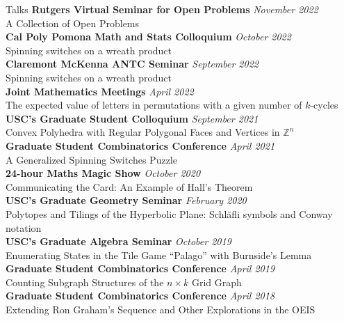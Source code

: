 \documentclass{cv} %
\begin{document}
\begin{rSection}{Talks}
  \textbf{Rutgers Virtual Seminar for Open Problems} \hfill \textit{November 2022} \\
  A Collection of Open Problems
  \\
  \textbf{Cal Poly Pomona Math and Stats Colloquium} \hfill \textit{October 2022} \\
  Spinning switches on a wreath product
  \\
  \textbf{Claremont McKenna ANTC Seminar} \hfill \textit{September 2022} \\
  Spinning switches on a wreath product
  \\
  \textbf{Joint Mathematics Meetings} \hfill \textit{April 2022} \\
  The expected value of letters in permutations with a given number of $k$-cycles
  \\
  \textbf{USC's Graduate Student Colloquium} \hfill \textit{September 2021} \\
  Convex Polyhedra with Regular Polygonal Faces and Vertices in $\mathbb Z^n$
  \\
  \textbf{Graduate Student Combinatorics Conference} \hfill \textit{April 2021} \\
  A Generalized Spinning Switches Puzzle
  \\
  \textbf{24-hour Maths Magic Show} \hfill \textit{October 2020} \\
  Communicating the Card: An Example of Hall's Theorem
  \\
  \textbf{USC's Graduate Geometry Seminar} \hfill \textit{February 2020} \\
  Polytopes and Tilings of the Hyperbolic Plane: Schl\"afli symbols and Conway notation
  \\
  \textbf{USC's Graduate Algebra Seminar} \hfill \textit{October 2019} \\
  Enumerating States in the Tile Game ``Palago'' with Burnside's Lemma
  \\
  \textbf{Graduate Student Combinatorics Conference} \hfill \textit{April 2019} \\
  Counting Subgraph Structures of the \(n \times k\) Grid Graph
  \\
  \textbf{Graduate Student Combinatorics Conference} \hfill \textit{April 2018} \\
  Extending Ron Graham's Sequence and Other Explorations in the OEIS
\end{rSection}
\end{document}
